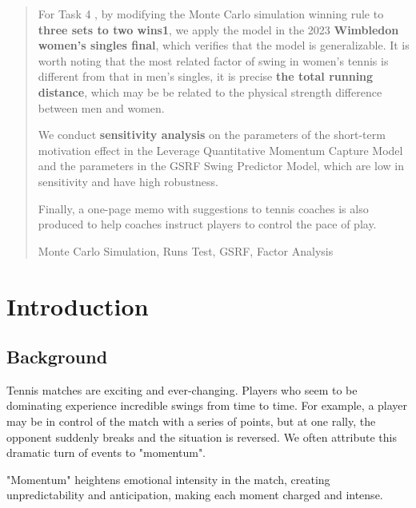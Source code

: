 \documentclass{mcmthesis}
\renewcommand{\contentsname}{\hspace*{\fill}\Large\bfseries Contents \hspace*{\fill}}
\begin{document}
\begin{abstract}
  For Task 4 , by modifying the Monte Carlo simulation winning rule to \textbf{three sets to two
  wins1}, we apply the model in the 2023 \textbf{Wimbledon women’s singles final}, which verifies that
  the model is generalizable. It is worth noting that the most related factor of swing in women’s
  tennis is different from that in men’s singles, it is precise \textbf{the total running distance}, which
  may be be related to the physical strength difference between men and women.\par
  We conduct \textbf{sensitivity analysis} on the parameters of the short-term motivation effect in
  the Leverage Quantitative Momentum Capture Model and the parameters in the GSRF Swing
  Predictor Model, which are low in sensitivity and have high robustness.\par
  Finally, a one-page memo with suggestions to tennis coaches is also produced to help coaches
  instruct players to control the pace of play.
  
\begin{keywords}
  Monte Carlo Simulation, Runs Test, GSRF, Factor Analysis
\end{keywords}

\end{abstract}

\maketitle

\tableofcontents        %
\thispagestyle{empty}

\newpage

\section{Introduction}

\subsection{Background}

Tennis matches are exciting and ever-changing. Players who seem to be dominating experience incredible swings 
from time to time. For example, a player may be in control of the
match with a series of points, but at one rally, the opponent suddenly breaks and the situation is
reversed. We often attribute this dramatic turn of events to "momentum".\par
"Momentum" heightens emotional intensity in the match, creating unpredictability and
anticipation, making each moment charged and intense.
\end{document}
